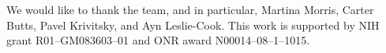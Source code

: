 \documentclass[nojss]{jss}
\begin{document}
We would like to thank the  team, and in particular, Martina Morris, Carter
Butts, Pavel Krivitsky, and Ayn Leslie-Cook.
This work is supported by NIH grant R01--GM083603--01 
and ONR award N00014--08--1--1015.









\end{document}
